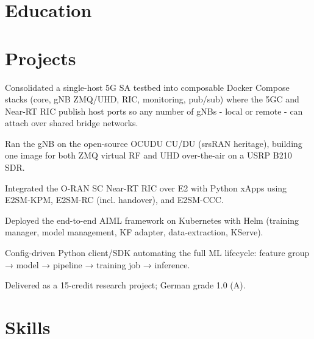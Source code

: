 \documentclass[10pt,a4paper]{resume}
\begin{document}
\section{Education}

\vspace{2pt}

\section{Projects}

\bullets
  \item Consolidated a single-host 5G SA testbed into composable Docker Compose stacks (core, gNB ZMQ/UHD, RIC, monitoring, pub/sub) where the 5GC and Near-RT RIC publish host ports so any number of gNBs - local or remote - can attach over shared bridge networks.
  \item Ran the gNB on the open-source OCUDU CU/DU (srsRAN heritage), building one image for both ZMQ virtual RF and UHD over-the-air on a USRP B210 SDR.
  \item Integrated the O-RAN SC Near-RT RIC over E2 with Python xApps using E2SM-KPM, E2SM-RC (incl. handover), and E2SM-CCC.
\bulletsend
\vspace{1.0pt}
\bullets
  \item Deployed the end-to-end AIML framework on Kubernetes with Helm (training manager, model management, KF adapter, data-extraction, KServe).
  \item Config-driven Python client/SDK automating the full ML lifecycle: feature group → model → pipeline → training job → inference.
  \item Delivered as a 15-credit research project; German grade 1.0 (A).
\bulletsend

\section{Skills}
\end{document}
